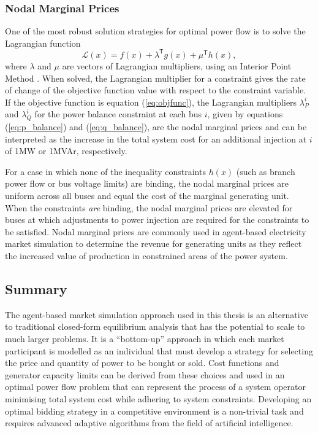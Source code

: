 \subsubsection{Nodal Marginal Prices}
One of the most robust solution strategies for optimal power flow is to solve
the Lagrangian function
\begin{equation}
\mathcal{L}(x) = f(x) + \lambda^\mathsf{T}g(x) + \mu^\mathsf{T}h(x),
\end{equation}
where $\lambda$ and $\mu$ are vectors of Lagrangian multipliers, using an
Interior Point Method \cite{cvxopt:2004,zimmerman:ccv}.  When solved, the Lagrangian
multiplier for a constraint gives the rate of change of the objective function
value with respect to the constraint variable.  If the objective function is
equation (\ref{eq:objfunc}), the Lagrangian multipliers $\lambda^i_P$ and
$\lambda^i_Q$ for the power balance constraint at each bus $i$, given by
equations (\ref{eq:p_balance}) and (\ref{eq:q_balance}), are the nodal marginal
prices and can be interpreted as the increase in the total system cost for an
additional injection at $i$ of 1MW or 1MVAr, respectively.

For a case in which none of the inequality constraints $h(x)$
(such as branch power flow or bus voltage limits) are binding, the nodal
marginal prices are uniform across all buses and equal the cost of the
marginal generating unit.  When the constraints \textit{are} binding, the nodal
marginal prices are elevated for buses at which adjustments to power injection
are required for the constraints to be satisfied.  Nodal marginal prices are
commonly used in agent-based electricity market simulation to determine the
revenue for generating units as they reflect the increased value of production
in constrained areas of the power system.

\subsection{Summary}
The agent-based market simulation approach used in this thesis is an alternative
to traditional closed-form equilibrium analysis that has the potential to scale
to much larger problems. It is a ``bottom-up'' approach in which each market
participant is modelled as an individual that must develop a strategy for
selecting the price and quantity of power to be bought or sold.  Cost functions
and generator capacity limits can be derived from these choices and used in an
optimal power flow problem that can represent the process of a system operator
minimising total system cost while adhering to system constraints.
Developing an optimal bidding strategy in a competitive environment is a
non-trivial task and requires advanced adaptive algorithms from the field of
artificial intelligence.


